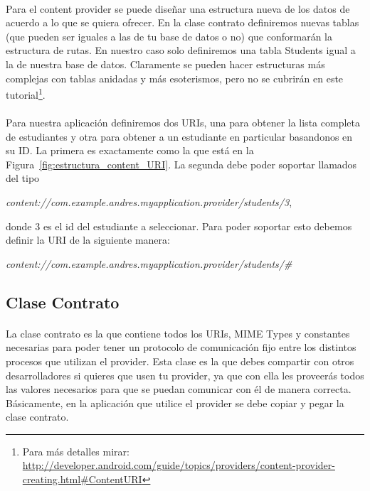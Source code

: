 \documentclass[10pt]{extarticle}
\begin{document}
\paragraph{}
Para el content provider se puede diseñar una estructura nueva de los datos de acuerdo a lo que se quiera ofrecer. En la clase contrato definiremos nuevas tablas (que pueden ser iguales a las de tu base de datos o no) que conformarán la estructura de rutas. En nuestro caso solo definiremos una tabla Students igual a la de nuestra base de datos. Claramente se pueden hacer estructuras más complejas con tablas anidadas y más esoterismos, pero no se cubrirán en este tutorial\footnote{Para más detalles mirar: \url{http://developer.android.com/guide/topics/providers/content-provider-creating.html\#ContentURI}}.

\paragraph{}
Para nuestra aplicación definiremos dos URIs, una para obtener la lista completa de estudiantes y otra para obtener a un estudiante en particular basandonos en su ID. La primera es exactamente como la que está en la Figura~\ref{fig:estructura_content_URI}. La segunda debe poder soportar llamados del tipo 
\begin{center}
\textit{content://com.example.andres.myapplication.provider/students/3},
\end{center}
donde 3 es el id del estudiante a seleccionar. Para poder soportar esto debemos definir la URI de la siguiente manera:

\begin{center}
\textit{content://com.example.andres.myapplication.provider/students/\#}
\end{center}


\subsection{Clase Contrato}

\paragraph{}
La clase contrato es la que contiene todos los URIs, MIME Types y constantes necesarias para poder tener un protocolo de comunicación fijo entre los distintos procesos que utilizan el provider. Esta clase es la que debes compartir con otros desarrolladores si quieres que usen tu provider, ya que con ella les proveerás todos las valores necesarios para que se puedan comunicar con él de manera correcta. Básicamente, en la aplicación que utilice el provider se debe copiar y pegar la clase contrato.
\end{document}
